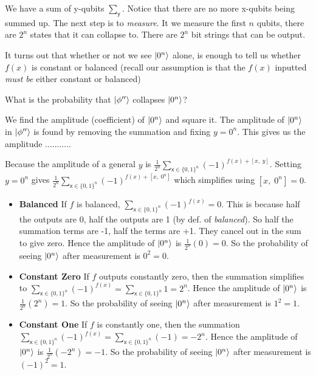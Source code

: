 We have a sum of y-qubits $\sum_{\textsf{y}}$. 
Notice that there are no more x-qubits being summed up.
The next step is to \textit{measure}. 
It we measure the first $n$ qubits, there are $2^n$ states that it can collapse to. 
There are $2^n$ bit strings that can be output. 

It turns out that whether or not we see $\left|0^n\right\rangle$ alone, is enough to
tell us whether $f(x)$ is constant or balanced
(recall our assumption is that the $f(x)$ inputted \textit{must be} either 
constant or balanced)


\frmrule

\begin{example}
What is the probability that $\left|\phi''\right\rangle$ collapses $\left|0^n\right\rangle$?

We find the amplitude (coefficient) of $\left|0^n\right\rangle$ and square it. 
The amplitude of $\left|0^n\right\rangle$ in $\left|\phi''\right\rangle$ is found by removing the summation and 
fixing $y = 0^n$. This gives us the amplitude ...........


Because the amplitude of a general 
$y$ is $\frac{1}{2^n} \sum_{\textsf{x} \in \{0,1\}^n} (-1)^{f(x)+[x,\;y]}$.
Setting $y = 0^n$ gives $\frac{1}{2^n} \sum_{\textsf{x} \in \{0,1\}^n} (-1)^{f(x)+[x,\;0^n]}$
which simplifies using $[x,\;0^n] = 0$.

\end{example}


\begin{itemize}   
\renewcommand{\labelitemi}{$\Box$}
\item \textbf{Balanced}
If $f$ is balanced, $\sum_{\textsf{x} \in \{0,1\}^n} (-1)^{f(x)} = 0$. This is because 
half the outputs are 0, half the outputs are 1 (by def. of \textit{balanced}). 
So half the summation terms are -1, half the terms are +1. 
They cancel out in the sum to give zero. Hence the amplitude of $\left|0^n\right\rangle$ is $\frac{1}{2^n}(0) = 0$.
So the probability of seeing $\left|0^n\right\rangle$ after measurement is $0^2 = 0$.
\item \textbf{Constant Zero} 
If $f$ outputs constantly zero, then the summation simplifies to
$\sum_{\textsf{x} \in \{0,1\}^n} (-1)^{f(x)} = \sum_{\textsf{x} \in \{0,1\}^n} 1 = 2^n$. 
Hence the amplitude of $\left|0^n\right\rangle$ is $\frac{1}{2^n}(2^n) = 1$.
So the probability of seeing $\left|0^n\right\rangle$ after measurement is $1^2 = 1$.
\item \textbf{Constant One}
If $f$ is constantly one, then the summation 
$\sum_{\textsf{x} \in \{0,1\}^n} (-1)^{f(x)} = \sum_{\textsf{x} \in \{0,1\}^n} (-1) = -2^n$.
Hence the amplitude of $\left|0^n\right\rangle$ is $\frac{1}{2^n}(-2^n) = -1$.
So the probability of seeing $\left|0^n\right\rangle$ after measurement is $(-1)^2 = 1$.
\end{itemize}

